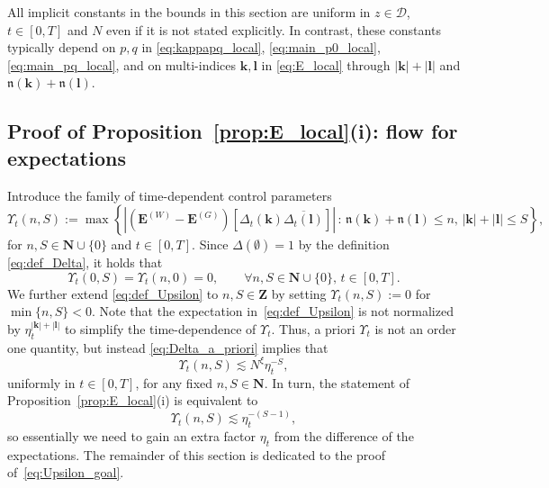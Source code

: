\documentclass[10pt]{amsart}
\numberwithin{equation}{section}
\newcommand{\nc}{\normalcolor}
\newcommand{\E}{\mathbf{E}}
\newcommand{\N}{\mathbf{N}}
\begin{document}
All implicit constants in the bounds in this section are uniform in $z\in\mathcal{D}$, $t\in [0,T]$ and $N$ even if it is not stated explicitly. In contrast, these constants typically depend on $p,q$ in \eqref{eq:kappapq_local}, \eqref{eq:main_p0_local}, \eqref{eq:main_pq_local}, and on multi-indices $\bm{k},\bm{l}$ in \eqref{eq:E_local} through $|\bm{k}|+|\bm{l}|$ and $\mathfrak{n}(\bm{k})+\mathfrak{n}(\bm{l})$.  

\subsection{Proof of Proposition~\ref{prop:E_local}(i): flow for expectations}\label{sec:E_local}

Introduce the family of time-dependent control parameters
\begin{equation}
\Upsilon_t(n,S):=\max\left\lbrace \left\vert\left(\E^{(W)}-\E^{(G)}\right)\left[\Delta_t(\bm{k}) \overline{\Delta_t(\bm{l})}\right]\right\vert\,:\, \mathfrak{n}(\bm{k})+\mathfrak{n}(\bm{l})\le n, \, |\bm{k}|+|\bm{l}|\le S \right\rbrace,
\label{eq:def_Upsilon}
\end{equation}
for $n,S\in\N \cup \{ 0\} $ and $t\in [0,T]$. Since $\Delta(\emptyset)=1$ by the definition \eqref{eq:def_Delta}, it holds that
\begin{equation}
\Upsilon_t(0,S)=\Upsilon_t(n,0)=0,\qquad \forall n,S\in\N\cup\{0\},\, t\in [0,T].
\label{eq:Upsilon_init}
\end{equation}
We further extend \eqref{eq:def_Upsilon} to $n,S\in\mathbf{Z}$ by setting $\Upsilon_t(n,S):=0$ for $\min\{n,S\}<0$. \nc
Note that the expectation in~\eqref{eq:def_Upsilon} is not normalized by $\eta_t^{|\bm{k}|+|\bm{l}|}$ to simplify the time-dependence of $\Upsilon_t$. Thus, a priori $\Upsilon_t$ is not an order one quantity, but instead \eqref{eq:Delta_a_priori} implies that
\begin{equation}
\Upsilon_t(n,S)\lesssim N^\xi \eta_t^{-S},
\label{eq:Upsilon_a_priori}
\end{equation}
uniformly in $t\in [0,T]$, for any fixed $n,S\in \N$. In turn, the statement of Proposition~\ref{prop:E_local}(i) is equivalent to
\begin{equation}
\Upsilon_t(n,S) \lesssim \eta_t^{-(S-1)},
\label{eq:Upsilon_goal}
\end{equation}
so essentially we need to gain an extra factor $\eta_t$ from the difference of the expectations. The remainder of this section is dedicated to the proof of~\eqref{eq:Upsilon_goal}.
\end{document}
